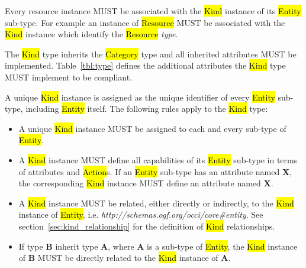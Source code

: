 \documentclass[10pt,a4paper,british]{article}
\begin{document}
Every resource instance MUST be associated with the \hl{Kind} instance of its
\hl{Entity} sub-type. For example an instance of \hl{Resource} MUST be
associated with the \hl{Kind} instance which identify the \hl{Resource} {\em
type}.

The \hl{Kind} type inherits the \hl{Category} type and all inherited
attributes MUST be implemented. Table~\ref{tbl:type} defines the
additional attributes the \hl{Kind} type MUST implement to be compliant.

A unique \hl{Kind} instance is assigned as the unique identifier of every
\hl{Entity} sub-type, including \hl{Entity} itself. The following rules apply
to the \hl{Kind} type:
\begin{itemize}
\item A unique \hl{Kind} instance MUST be assigned to each and every sub-type
 of \hl{Entity}.
\item A \hl{Kind} instance MUST define all capabilities of its \hl{Entity}
 sub-type in terms of attributes and \hl{Action}s. If an \hl{Entity} sub-type
 has an attribute named {\bf X}, the corresponding \hl{Kind} instance MUST define
 an attribute named {\bf X}.
\item A \hl{Kind} instance MUST be related, either directly or indirectly, to
 the \hl{Kind} instance of \hl{Entity},
 i.e. \textit{http://schemas.ogf.org/occi/core\#entity}.
 See section~\ref{sec:kind_relationship} for the definition of \hl{Kind}
 relationships.
\item If type {\bf B} inherit type {\bf A}, where {\bf A} is a sub-type of
 \hl{Entity}, the \hl{Kind} instance of {\bf B} MUST be directly related to the
 \hl{Kind} instance of {\bf A}.
\end{itemize}
\end{document}
